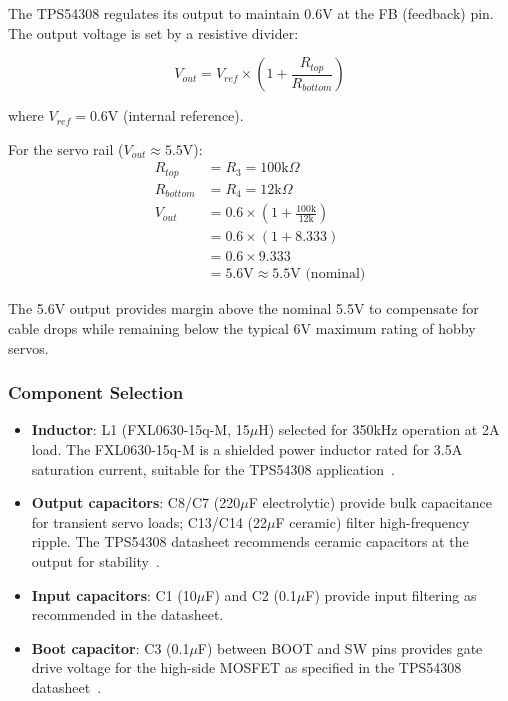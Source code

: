 \documentclass[12pt, titlepage]{article}
\begin{document}
The TPS54308 regulates its output to maintain 0.6V at the FB (feedback) pin.
The output voltage is set by a resistive divider:

\begin{equation}
  V_{out} = V_{ref} \times \left(1 + \frac{R_{top}}{R_{bottom}}\right)
\end{equation}

where $V_{ref} = 0.6$V (internal reference).

For the servo rail ($V_{out} \approx 5.5$V):
\begin{align}
  R_{top}    & = R_3 = 100\text{k}\Omega                                    \\
  R_{bottom} & = R_4 = 12\text{k}\Omega                                     \\
  V_{out}    & = 0.6 \times \left(1 + \frac{100\text{k}}{12\text{k}}\right) \\
             & = 0.6 \times (1 + 8.333)                                     \\
             & = 0.6 \times 9.333                                           \\
             & = 5.6\text{V} \approx 5.5\text{V (nominal)}
\end{align}

The 5.6V output provides margin above the nominal 5.5V to compensate for cable
drops while remaining below the typical 6V maximum rating of hobby servos.

\subsubsection{Component Selection}

\begin{itemize}[leftmargin=*]
  \item \textbf{Inductor}: L1 (FXL0630-15q-M, 15$\mu$H) selected
        for 350kHz operation at 2A load. The FXL0630-15q-M is a
        shielded power inductor rated for 3.5A saturation current,
        suitable for the TPS54308 application~\citep{TaiyoYuden_FXL0630_2024}.
  \item \textbf{Output capacitors}: C8/C7 (220$\mu$F electrolytic)
        provide bulk capacitance for transient servo loads; C13/C14
        (22$\mu$F ceramic) filter high-frequency ripple. The TPS54308
        datasheet recommends ceramic capacitors at the output for
        stability~\citep{TI_TPS54308_2021}.
  \item \textbf{Input capacitors}: C1 (10$\mu$F) and C2 (0.1$\mu$F)
        provide input filtering as recommended in the datasheet.
  \item \textbf{Boot capacitor}: C3 (0.1$\mu$F) between BOOT and SW
        pins provides gate drive voltage for the high-side MOSFET
        as specified in the TPS54308 datasheet~\citep{TI_TPS54308_2021}.
\end{itemize}
\end{document}
